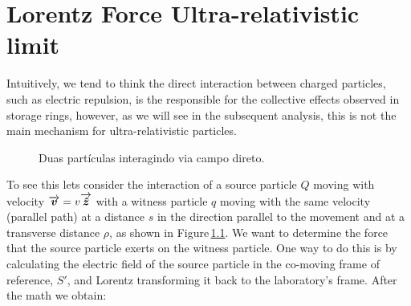 \chapter{Lorentz Force Ultra-relativistic limit}\label{app:lorentz_cancel}
Intuitively, we tend to think the direct interaction between charged particles, such as electric repulsion, is the responsible for the collective effects observed in storage rings, however, as we will see in the subsequent analysis, this is not the main mechanism for ultra-relativistic particles.

\begin{figure}[hb!]
    \centering
    \label{fig:wake1}
    \caption{Duas partículas interagindo via campo direto.}
\end{figure}

To see this lets consider the interaction of a source particle $Q$ moving with velocity $\overrightarrow{\boldsymbol{v}}=v{\overrightarrow{\boldsymbol{\hat{z}}}}$ with a witness particle $q$ moving with the same velocity (parallel path) at a distance $s$ in the direction parallel to the movement and at a transverse distance $\rho$, as shown in Figure\,\ref{fig:wake1}. We want to determine the force that the source particle exerts on the witness particle. One way to do this is by calculating the electric field of the source particle in the co-moving frame of reference, $S'$, and Lorentz transforming it back to the laboratory's frame. After the math we obtain:

